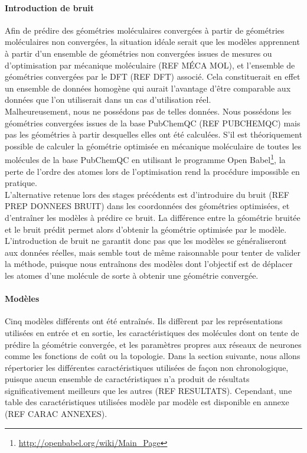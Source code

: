 \paragraph{Introduction de bruit} Afin de prédire des géométries moléculaires convergées à partir de géométries moléculaires non convergées, la situation idéale serait que les modèles apprennent à partir d'un ensemble de géométries non convergées issues de mesures ou d'optimisation par mécanique moléculaire (REF MÉCA MOL), et l'ensemble de géométries convergées par le DFT (REF DFT) associé. Cela constituerait en effet un ensemble de données homogène qui aurait l'avantage d'être comparable aux données que l'on utiliserait dans un cas d'utilisation réel.\\
Malheureusement, nous ne possédons pas de telles données. Nous possédons les géométries convergées issues de la base PubChemQC (REF PUBCHEMQC) mais pas les géométries à partir desquelles elles ont été calculées. S'il est théoriquement possible de calculer la géométrie optimisée en mécanique moléculaire de toutes les molécules de la base PubChemQC en utilisant le programme Open Babel\footnote{\url{http://openbabel.org/wiki/Main_Page}}, la perte de l'ordre des atomes lors de l'optimisation rend la procédure impossible en pratique.\\
L'alternative retenue lors des stages précédents est d'introduire du bruit (REF PREP DONNEES BRUIT) dans les coordonnées des géométries optimisées, et d'entraîner les modèles à prédire ce bruit. La différence entre la géométrie bruitée et le bruit prédit permet alors d'obtenir la géométrie optimisée par le modèle. L'introduction de bruit ne garantit donc pas que les modèles se généraliseront aux données réelles, mais semble tout de même raisonnable pour tenter de valider la méthode, puisque nous entraînons des modèles dont l'objectif est de déplacer les atomes d'une molécule de sorte à obtenir une géométrie convergée.

\paragraph{Modèles} Cinq modèles différents ont été entraînés. Ils diffèrent par les représentations utilisées en entrée et en sortie, les caractéristiques des molécules dont on tente de prédire la géométrie convergée, et les paramètres propres aux réseaux de neurones comme les fonctions de coût ou la topologie. Dans la section suivante, nous allons répertorier les différentes caractéristiques utilisées de façon non chronologique, puisque aucun ensemble de caractéristiques n'a produit de résultats significativement meilleurs que les autres (REF RESULTATS). Cependant, une table des caractéristiques utilisées modèle par modèle est disponible en annexe (REF CARAC ANNEXES).